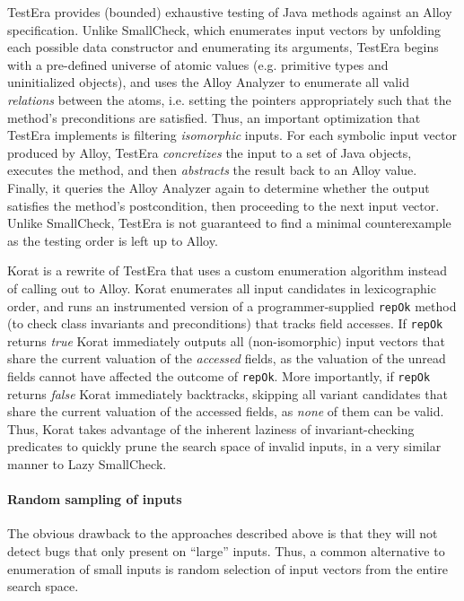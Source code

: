 TestEra \cite{khurshid_testera:_2004,marinov_testera:_2001} provides
(bounded) exhaustive testing of Java methods against an Alloy
\cite{jackson_automating_2000} specification.
%
Unlike SmallCheck, which enumerates input vectors by unfolding each
possible data constructor and enumerating its arguments, TestEra begins
with a pre-defined universe of atomic values (e.g. primitive types and
uninitialized objects), and uses the Alloy Analyzer
\cite{jackson_alcoa:_2000} to enumerate all valid \emph{relations}
between the atoms, i.e. setting the pointers appropriately such that the
method's preconditions are satisfied.
%
Thus, an important optimization that TestEra implements is filtering
\emph{isomorphic} inputs.
%
For each symbolic input vector produced by Alloy, TestEra
\emph{concretizes} the input to a set of Java objects, executes the
method, and then \emph{abstracts} the result back to an Alloy
value.
%
Finally, it queries the Alloy Analyzer again to determine whether the
output satisfies the method's postcondition, then proceeding to the next
input vector.
%
Unlike SmallCheck, TestEra is not guaranteed to find a minimal
counterexample as the testing order is left up to Alloy.

Korat \cite{boyapati_korat:_2002} is a rewrite of TestEra that uses a
custom enumeration algorithm instead of calling out to Alloy.
%
Korat enumerates all input candidates in lexicographic order, and runs
an instrumented version of a programmer-supplied \texttt{repOk} method
(to check class invariants and preconditions) that tracks field
accesses.
%
If \texttt{repOk} returns \emph{true} Korat immediately outputs all
(non-isomorphic) input vectors that share the current valuation of the
\emph{accessed} fields, as the valuation of the unread fields cannot
have affected the outcome of \texttt{repOk}.
%
More importantly, if \texttt{repOk} returns \emph{false} Korat
immediately backtracks, skipping all variant candidates that share the
current valuation of the accessed fields, as \emph{none} of them can be
valid.
%
Thus, Korat takes advantage of the inherent laziness of
invariant-checking predicates to quickly prune the search space of
invalid inputs, in a very similar manner to Lazy SmallCheck.

\paragraph{Random sampling of inputs}
The obvious drawback to the approaches described above is that they will
not detect bugs that only present on ``large'' inputs.
%
Thus, a common alternative to enumeration of small inputs is random
selection of input vectors from the entire search space.

